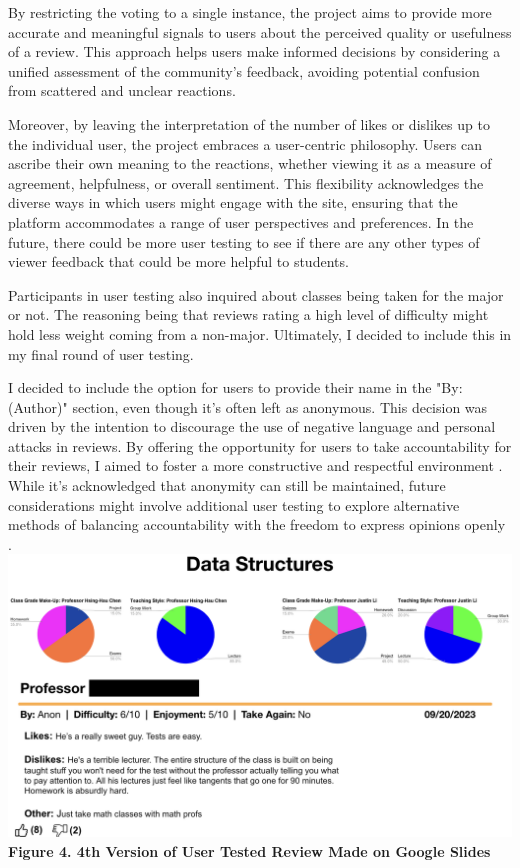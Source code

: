\documentclass[10pt,twocolumn]{article}
\begin{document}
By restricting the voting to a single instance, the project aims to provide more accurate and meaningful signals to users about the perceived quality or usefulness of a review. This approach helps users make informed decisions by considering a unified assessment of the community's feedback, avoiding potential confusion from scattered and unclear reactions.

Moreover, by leaving the interpretation of the number of likes or dislikes up to the individual user, the project embraces a user-centric philosophy. Users can ascribe their own meaning to the reactions, whether viewing it as a measure of agreement, helpfulness, or overall sentiment. This flexibility acknowledges the diverse ways in which users might engage with the site, ensuring that the platform accommodates a range of user perspectives and preferences. In the future, there could be more user testing to see if there are any other types of viewer feedback that could be more helpful to students. 

Participants in user testing also inquired about classes being taken for the major or not. The reasoning being that reviews rating a high level of difficulty might hold less weight coming from a non-major. Ultimately, I decided to include this in my final round of user testing. 

I decided to include the option for users to provide their name in the "By: (Author)" section, even though it's often left as anonymous. This decision was driven by the intention to discourage the use of negative language and personal attacks in reviews. By offering the opportunity for users to take accountability for their reviews, I aimed to foster a more constructive and respectful environment \cite{ellis1984}. While it's acknowledged that anonymity can still be maintained, future considerations might involve additional user testing to explore alternative methods of balancing accountability with the freedom to express opinions openly .\\


\includegraphics[scale=.27]{UT4}\\ \textbf{\footnotesize{Figure 4. 4th Version of User Tested Review Made on Google Slides}}
\end{document}
